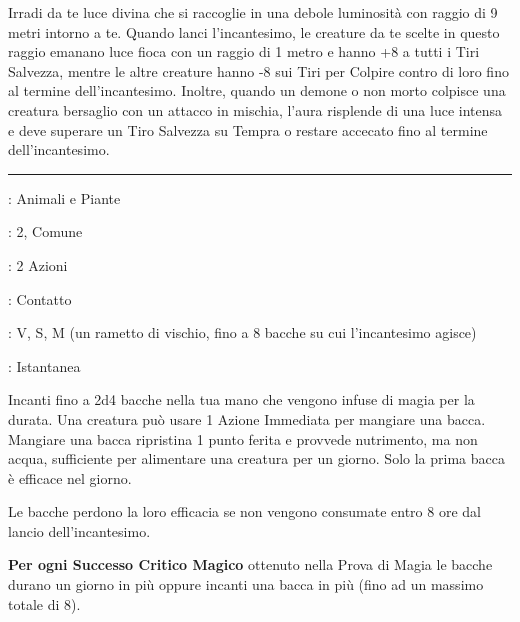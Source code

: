 \begin{multicols}{2}
Irradi da te luce divina che si raccoglie in una debole luminosità con raggio di 9 metri intorno a te. Quando lanci l'incantesimo, le creature da te scelte in questo raggio emanano luce fioca con un raggio di 1 metro e hanno +8 a tutti i Tiri Salvezza, mentre le altre creature hanno -8 sui Tiri per Colpire contro di loro fino al termine dell'incantesimo. Inoltre, quando un demone o non morto colpisce una creatura bersaglio con un attacco in mischia, l'aura risplende di una luce intensa e deve superare un Tiro Salvezza su Tempra o restare accecato fino al termine dell'incantesimo.

\smallskip\noindent\rule{\linewidth}{2pt} \hypertarget{Bacche Benefiche}{}\smallskip{}
\noindent
\begin{description}[noitemsep, topsep=0pt, parsep=0pt, partopsep=0pt, leftmargin=0cm, labelwidth=2.8cm]
	\item[\textbf{Lista di Magia}]: Animali e Piante
	\item[\textbf{Livello}]: 2, Comune
	\item[\textbf{T. di Lancio}]: 2 Azioni
	\item[\textbf{Gittata}]: Contatto
	\item[\textbf{Componenti}]: V, S, M (un rametto di vischio, fino a 8 bacche su cui l'incantesimo agisce)
	\item[\textbf{Durata}]: Istantanea
\end{description}

Incanti fino a 2d4 bacche nella tua mano che vengono infuse di magia per la durata. Una creatura può usare 1 Azione Immediata per mangiare una bacca. Mangiare una bacca ripristina 1 punto ferita e provvede nutrimento, ma non acqua, sufficiente per alimentare una creatura per un giorno. Solo la prima bacca è efficace nel giorno.

Le bacche perdono la loro efficacia se non vengono consumate entro 8 ore dal lancio dell'incantesimo.

\textbf{Per ogni Successo Critico Magico} ottenuto nella Prova di Magia le bacche durano un giorno in più oppure incanti una bacca in più (fino ad un massimo totale di 8).


\end{multicols}
